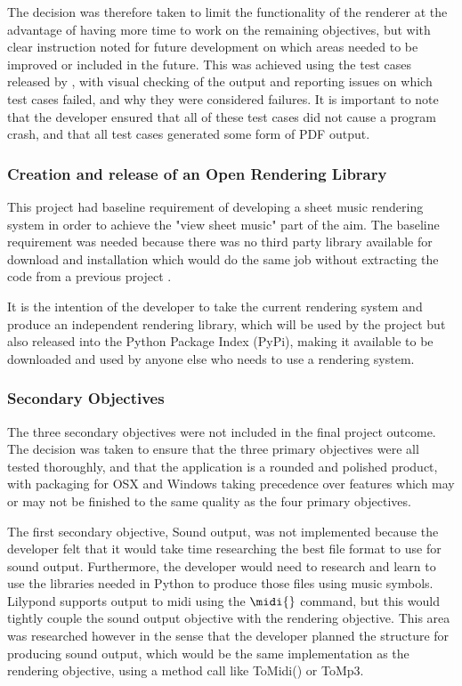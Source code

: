 The decision was therefore taken to limit the functionality of the renderer at the advantage of having more time to work on the remaining objectives, but with clear instruction noted for future development on which areas needed to be improved or included in the future. This was achieved using the test cases released by \cite{Lilypond}, with visual checking of the output and reporting issues on which test cases failed, and why they were considered failures. It is important to note that the developer ensured that all of these test cases did not cause a program crash, and that all test cases generated some form of PDF output.

\subsubsection{Creation and release of an Open Rendering Library}
This project had baseline requirement of developing a sheet music rendering system in order to achieve the "view sheet music" part of the aim.  The baseline requirement was needed because there was no third party library available for download and installation which would do the same job without extracting the code from a previous project \parencite{pypi}.

It is the intention of the developer to take the current rendering system and produce an independent rendering library, which will be used by the project but also released into the Python Package Index (PyPi), making it available to be downloaded and used by anyone else who needs to use a rendering system.

\subsubsection{Secondary Objectives}
The three secondary objectives were not included in the final project outcome.  The decision was taken to ensure that the three primary objectives were all tested thoroughly, and that the application is a rounded and polished product, with packaging for OSX and Windows taking precedence over features which may or may not be finished to the same quality as the four primary objectives. 

The first secondary objective, Sound output, was not implemented because the developer felt that it would take time researching the best file format to use for sound output. Furthermore, the developer would need to research and learn to use the libraries needed in Python to produce those files using music symbols. Lilypond supports output to midi using the $\midi{}$ command, but this would tightly couple the sound output objective with the rendering objective. This area was researched however in the sense that the developer planned the structure for producing sound output, which would be the same implementation as the rendering objective, using a method call like ToMidi() or ToMp3.

